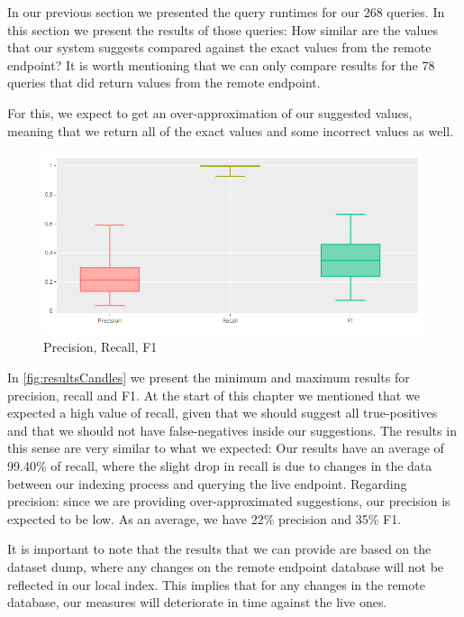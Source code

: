 In our previous section we presented the query runtimes for our 268 queries. In this section we present the results of those queries: How similar are the values that our system suggests compared against the exact values from the remote endpoint? It is worth mentioning that we can only compare  results for the 78 queries that did return values from the remote endpoint. 

For this, we expect to get an over-approximation of our suggested values, meaning that we return all of the exact values and some incorrect values as well. 

\begin{figure}[ht]
    \centering
        \includegraphics[width=\linewidth]{imagenes/resultsCandleStick.png}
        \caption{Precision, Recall, F1}
        \label{fig:resultsCandles}
\end{figure}

In \autoref{fig:resultsCandles} we present the minimum and maximum results for precision, recall and F1. At the start of this chapter we mentioned that we expected a high value of recall, given that we should suggest all true-positives and that we should not have false-negatives inside our suggestions. The results in this sense are very similar to what we expected: Our results have an average of 99.40\% of recall, where the slight drop in recall is due to changes in the data between our indexing process and querying the live endpoint. Regarding precision: since we are providing over-approximated suggestions, our precision is expected to be low. As an average, we have 22\% precision and 35\% F1.

It is important to note that the results that we can provide are based on the dataset dump, where any changes on the remote endpoint database will not be reflected in our local index. This implies that for any changes in the remote database, our measures will deteriorate in time against the live ones.

